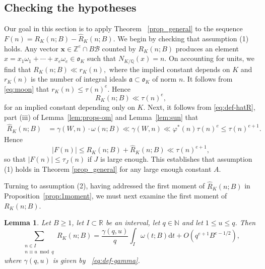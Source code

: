 \documentclass[11pt,letterpaper]{amsart}
\renewcommand{\leq}{\leqslant}
\renewcommand{\geq}{\geqslant}
\renewcommand{\d}{\mathrm{d}}
\newtheorem{lemma}[theorem]{Lemma}
\theoremstyle{definition}
\numberwithin{equation}{section}
\newcommand\RR{\mathbb{R}}
\newcommand\ZZ{\mathbb{Z}}
\newcommand\NN{\mathbb{N}}
\newcommand\QQ{\mathbb{Q}}
\newcommand{\x}{\mathbf{x}}
\DeclareMathOperator{\n}{N}
\newcommand{\fo}{\mathfrak{o}}
\newcommand{\fa}{\mathfrak{a}}
\newcommand{\0}{\mathbf{0}}
\begin{document}
\subsection{Checking the hypotheses}
Our goal in this section is to apply 
Theorem 
~\ref{prop_general} to the sequence
$
F(n)=R_K(n;B)-\hat R_K(n;B).
$
We begin by checking that assumption (1) holds.
Any vector $\x\in \ZZ^e\cap B\mathcal{B}$ counted by 
$R_K(n;B)$ produces an element $x=x_1\omega_1+\cdots+x_e\omega_e\in \fo_K$ such that 
$N_{K/\QQ}(x)=n$. On accounting for units,  we  find that  
$
R_K(n;B)\ll r_K(n),
$
where the implied constant depends on $K$ and 
$r_K(n)$ is the number of integral ideals $\fa\subset \fo_K$ of norm $n$. It follows from 
\eqref{eq:moon} that $r_K(n)\leq \tau(n)^e$. 
Hence
\begin{equation}\label{eq:cloth}
R_K(n;B)\ll \tau(n)^e,
\end{equation}
for an implied constant depending only on $K$.
Next, it follows from 
\eqref{eq:def-hatR},  part (iii) of Lemma~\ref{lem:props-om} and  Lemma~\ref{lem:sun} that 
\begin{align*}
\hat R_K(n;B)
&= \gamma(W,n) \cdot \omega(n;B)
\ll \gamma(W,n)
\ll \varphi^*(n)\tau(n)^e\leq \tau(n)^{e+1}.
\end{align*}
Hence 
$$
|F(n)|\leq R_K(n;B)+\hat R_K(n;B)\ll \tau(n)^{e+1},
$$
so that $|F(n)|\leq \tau_J(n)$ if $J$ is large enough.
This establishes  that   assumption (1) holds in Theorem 
\ref{prop_general} for any large enough constant $A$.

Turning to assumption (2), having addressed the first moment of  $\hat R_K(n;B)$ in 
Proposition~\ref{prop:1moment},
we must next examine the first moment of 
$R_K(n;B)$.

\begin{lemma}\label{lem:1stmom-1}
Let $B\geq 1$, let $I\subset \RR$ be an interval,  let $q\in \NN$ and let $1\leq u\leq q$. Then 
$$
\sum_{\substack{n\in I\\n\equiv u\bmod q}}R_K(n;B)=
\frac{\gamma(q,u)  }{q}
\int_{I}\omega(t;B)\d t
+O(q^{e+1} B^{e-1/2}),
$$
where $\gamma(q,u)$ is given by ~\eqref{eq:def-gamma}.
\end{lemma}
\end{document}
